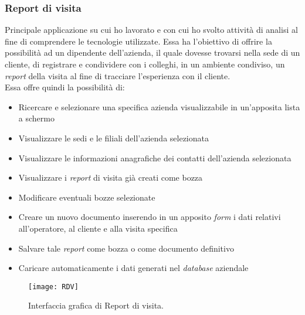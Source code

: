 \subsubsection*{Report di visita}
Principale applicazione su cui ho lavorato e con cui ho svolto attività di analisi al fine di comprendere le tecnologie utilizzate. Essa ha l'obiettivo di offrire la possibilità ad un dipendente dell'azienda, il quale dovesse trovarsi nella sede di un cliente, di registrare e condividere con i colleghi, in un ambiente condiviso, un \emph{report} della visita al fine di tracciare l'esperienza con il cliente.\\
Essa offre quindi la possibilità di: 
\begin{itemize}
    \item Ricercare e selezionare una specifica azienda visualizzabile in un'apposita lista a schermo 
    \item Visualizzare le sedi e le filiali dell'azienda selezionata 
    \item Visualizzare le informazioni anagrafiche dei contatti dell'azienda selezionata  
    \item Visualizzare i \emph{report} di visita già creati come bozza  
    \item Modificare eventuali bozze selezionate 
    \item Creare un nuovo documento inserendo in un apposito \emph{form} i dati relativi all'operatore, al cliente e alla visita specifica 
    \item Salvare tale \emph{report} come bozza o come documento definitivo
    \item Caricare automaticamente i dati generati nel \emph{database} aziendale 
\end{itemize}
\begin{figure}[htbp] 
    \centering 
    \texttt{[image: RDV]} 
    \caption{Interfaccia grafica di Report di visita.}
    \label{fig:RDV}
\end{figure}

